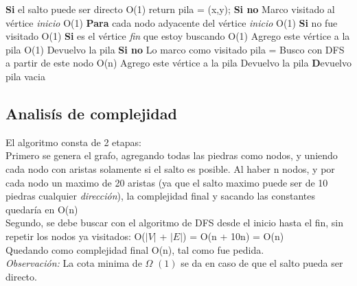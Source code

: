 \begin{codebox}
\li	\textbf{Si} el salto puede ser directo \Do 							\RComment O(1)
\li		return pila = (x,y); \End
\li	\textbf{Si no}  \Do
\li		Marco visitado al vértice \textit{inicio}						\RComment O(1)
\li		\textbf{Para} cada nodo adyacente del vértice \textit{inicio} \Do 	\RComment O(1)
\li			\textbf{Si} no fue visitado \Do \RComment O(1)
\li				\textbf{Si} es el vértice \textit{fin} que estoy buscando \Do \RComment O(1)	
\li					Agrego este vértice a la pila					\RComment O(1)
\li					Devuelvo la pila\End
\li				\textbf{Si no}  \Do
\li					Lo marco como visitado
\li					pila = Busco con DFS a partir de este nodo			\RComment O(n)
\li					Agrego este vértice a la pila
\li					Devuelvo la pila\End\End\End
\li	\textbf Devuelvo pila vacia
\end{codebox}

\subsection{Analisís de complejidad}	
El algoritmo consta de 2 etapas:\\ 


Primero se genera el grafo, agregando todas las piedras como nodos, y uniendo cada nodo con aristas solamente si el salto es posible. Al haber n nodos, y por cada nodo un maximo de 20 aristas (ya que el salto maximo puede ser de 10 piedras cualquier \textit{dirección}), la complejidad final y sacando las constantes quedaría en O(n)\\  
Segundo, se debe buscar con el algoritmo de DFS desde el inicio hasta el fin, sin repetir los nodos ya visitados: O($|V|$ + $|E|$) = O(n + 10n) = O(n)\\  

Quedando como complejidad final O(n), tal como fue pedida. \\
\textit{Observación:} La cota minima de $\Omega$ $(1)$ se da en caso de que el salto pueda ser directo.

